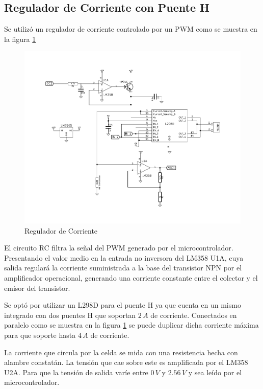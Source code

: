 \documentclass[10pt,spanish,a4paper,openany,notitlepage]{article}
\begin{document}
\subsection{Regulador de Corriente con Puente H}

Se utilizó un regulador de corriente controlado por un PWM como se muestra
en la figura \ref{fig:reg_corriente}

\begin{figure}[H] %
\begin{center}
\includegraphics[scale=1]{../circuitos/regulador_corriente.pdf}
\caption{Regulador de Corriente}
 \label{fig:reg_corriente}
\end{center}
\end{figure}

El circuito RC filtra la señal del PWM generado por el
microcontrolador. Presentando el valor medio en la entrada no inversora del LM358 U1A,
cuya salida regulará la corriente suministrada a la
base del transistor NPN por el amplificador operacional, generando una corriente
constante entre el colector y el emisor del transistor.

Se optó por utilizar un L298D para el puente H ya que cuenta en un mismo
integrado con dos puentes H que soportan $2\, \unit{A}$ de corriente. 
Conectados en paralelo como se muestra en la figura \ref{fig:reg_corriente} 
se puede duplicar dicha corriente máxima para que soporte hasta $4\, \unit{A}$ de corriente.

La corriente que circula por la celda se mida con una resistencia hecha con
alambre constatán. La tensión que cae sobre este es amplificada por el LM358 U2A.
Para que la tensión de salida varíe entre $0\, \unit{V}$ y $2.56\, \unit{V}$
y sea leído por el microcontrolador.
\end{document}
